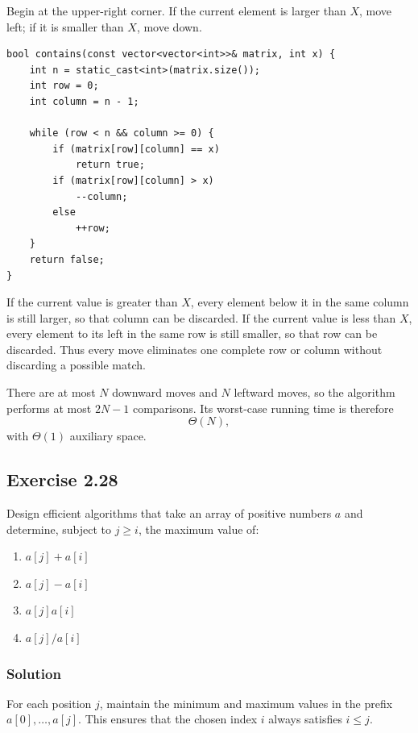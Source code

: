 \documentclass[12pt,a4paper]{article}
\begin{document}
Begin at the upper-right corner. If the current element is larger than
$X$, move left; if it is smaller than $X$, move down.

\begin{lstlisting}
bool contains(const vector<vector<int>>& matrix, int x) {
    int n = static_cast<int>(matrix.size());
    int row = 0;
    int column = n - 1;

    while (row < n && column >= 0) {
        if (matrix[row][column] == x)
            return true;
        if (matrix[row][column] > x)
            --column;
        else
            ++row;
    }
    return false;
}
\end{lstlisting}

If the current value is greater than $X$, every element below it in the
same column is still larger, so that column can be discarded. If the
current value is less than $X$, every element to its left in the same
row is still smaller, so that row can be discarded. Thus every move
eliminates one complete row or column without discarding a possible
match.

There are at most $N$ downward moves and $N$ leftward moves, so the
algorithm performs at most $2N-1$ comparisons. Its worst-case running
time is therefore
\[
\boxed{\Theta(N)},
\]
with $\Theta(1)$ auxiliary space.

\subsection*{\color{sectionnavy}Exercise 2.28}

\noindent
Design efficient algorithms that take an array of positive numbers
$a$ and determine, subject to $j\geq i$, the maximum value of:

\begin{enumerate}
  \renewcommand{\labelenumi}{\alph{enumi}.}
  \item $a[j]+a[i]$
  \item $a[j]-a[i]$
  \item $a[j]a[i]$
  \item $a[j]/a[i]$
\end{enumerate}

\subsubsection*{\color{sectionnavy}Solution}

For each position $j$, maintain the minimum and maximum values in the
prefix $a[0],\ldots,a[j]$. This ensures that the chosen index $i$ always
satisfies $i\leq j$.
\end{document}
